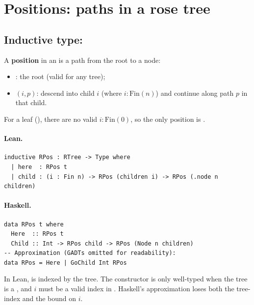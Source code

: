 \documentclass[11pt,a4paper]{article}
\begin{document}
\section{Positions: paths in a rose tree}

\subsection{Inductive type: }

\begin{defn}
A \textbf{position} in an  is a path from the root to a node:
\begin{itemize}
  \item {}: the root (valid for any tree);
  \item {}$(i, p)$: descend into child $i$ (where $i : \mathrm{Fin}(n)$)
        and continue along path $p$ in that child.
\end{itemize}
For a leaf (), there are no valid $i : \mathrm{Fin}(0)$,
so the only position is .
\end{defn}

\paragraph{Lean.}
\begin{lstlisting}[style=lean]
inductive RPos : RTree -> Type where
  | here  : RPos t
  | child : (i : Fin n) -> RPos (children i) -> RPos (.node n children)
\end{lstlisting}

\paragraph{Haskell.}
\begin{lstlisting}[style=haskell]
data RPos t where
  Here  :: RPos t
  Child :: Int -> RPos child -> RPos (Node n children)
-- Approximation (GADTs omitted for readability):
data RPos = Here | GoChild Int RPos
\end{lstlisting}

\begin{fidelitynote}
In Lean,  is indexed by the tree.  The  constructor
is only well-typed when the tree is a , and $i$
must be a valid index in .  Haskell's approximation loses
both the tree-index and the bound on $i$.
\end{fidelitynote}
\end{document}
